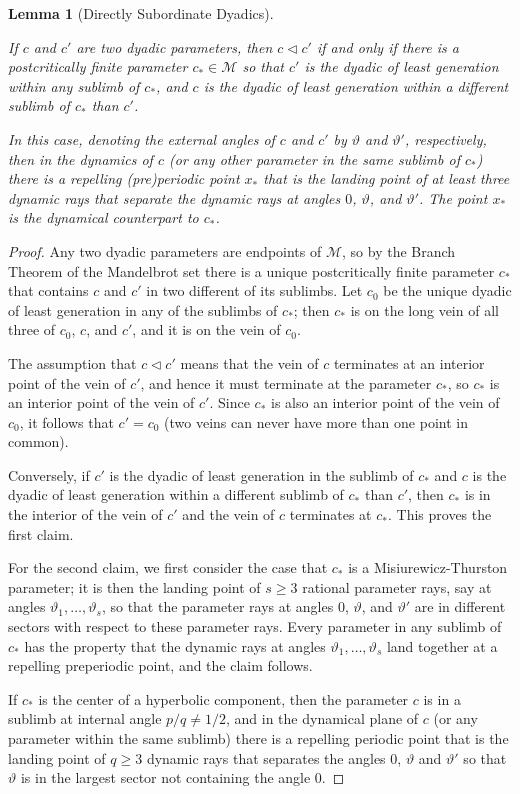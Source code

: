 \documentclass[12pt]{amsart}
\newcommand{\M}{\mathscr M}
\newcommand{\0}{\texttt{0}}
\newcommand{\1}{\texttt{1}}
\newtheorem{lemma}[theorem]{Lemma}
\theoremstyle{definition}
\numberwithin{equation}{section}
\renewcommand{\theta}{\vartheta}
\newcommand{\lineclear}{\rule{0pt}{2pt}\newline}
\begin{document}

\begin{lemma}[Directly Subordinate Dyadics]
\label{Lem:DirectlySubordinateDynamics} \lineclear
{}
If $c$ and $c'$ are two dyadic parameters, then $c\lhd c'$ if and only if there is a postcritically finite parameter $c_*\in\M$ so that $c'$ is the dyadic of least generation within any sublimb of $c_*$, and  $c$ is the dyadic of least generation within a different sublimb of $c_*$ than $c'$.

In this case, denoting the external angles of $c$ and $c'$ by $\theta$ and $\theta'$, respectively, then in the dynamics of $c$ (or any other parameter in the same sublimb of $c_*$) there is a repelling (pre)periodic point $x_*$ that is the landing point of at least three dynamic rays  that separate the dynamic rays at angles $0$, $\theta$, and $\theta'$. The point $x_*$ is the dynamical counterpart to $c_*$. 
\end{lemma}

\begin{proof}
Any two dyadic parameters are endpoints of $\M$, so by the Branch Theorem of the Mandelbrot set there is a unique postcritically finite parameter $c_*$ that contains $c$ and $c'$ in two different of its sublimbs. Let $c_0$ be the unique dyadic of least generation in any of the sublimbs of $c_*$; then $c_*$ is on the long vein of all three of $c_0$, $c$, and $c'$, and it is on the vein of $c_0$. 

The assumption that $c\lhd c'$ means that the vein of $c$ terminates at an interior point of the vein of $c'$, and hence it must terminate at the parameter $c_*$, so $c_*$ is an interior point of the vein of $c'$. Since $c_*$ is also an interior point of the vein of $c_0$, it follows that $c'=c_0$ (two veins can never have more than one point in common). 

Conversely, if $c'$ is the dyadic of least generation in the sublimb of $c_*$    and  $c$ is the dyadic of least generation within a different sublimb of $c_*$ than $c'$, then $c_*$ is in the interior of the vein of $c'$ and the vein of $c$ terminates at $c_*$. This proves the first claim.

For the second claim, we first consider the case that $c_*$ is a Mi\-siu\-re\-wicz-Thurston parameter; it is then the landing point of $s\ge 3$ rational parameter rays, say at angles $\theta_1,\dots,\theta_s$, so that the parameter rays at angles $0$, $\theta$, and $\theta'$ are in different sectors with respect to these parameter rays. Every parameter in any sublimb of $c_*$ has the property that the dynamic rays at angles $\theta_1,\dots,\theta_s$ land together at a repelling preperiodic point, and the claim follows.

If $c_*$ is the center of a hyperbolic component, then the parameter $c$ is in a sublimb at internal angle $p/q\neq 1/2$, and in the dynamical plane of $c$ (or any parameter within the same sublimb) there is a repelling periodic point that is the landing point of $q\ge 3$ dynamic rays that separates the angles $0$, $\theta$ and $\theta'$ so that $\theta$ is in the largest sector not containing the angle $0$. 
\end{proof}
\end{document}
